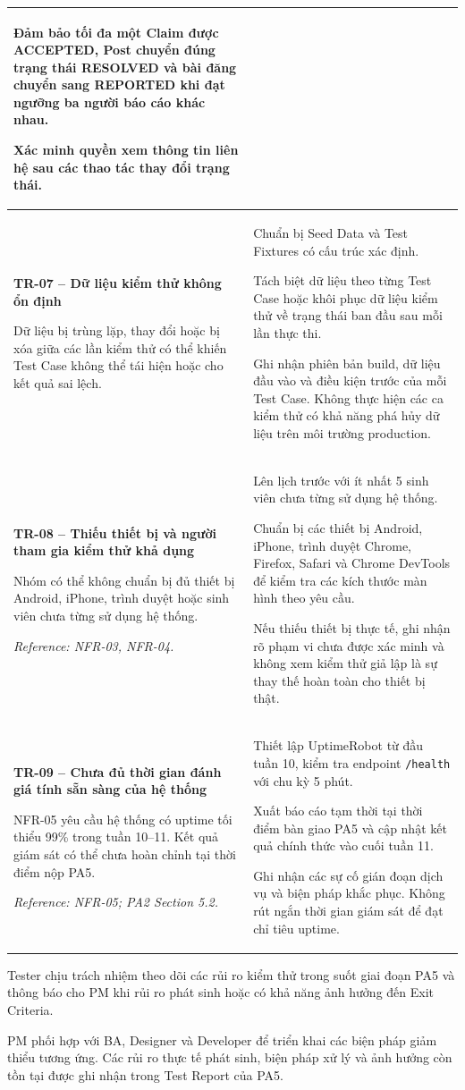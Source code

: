 \begin{longtable}{|p{}|p{}|}
Đảm bảo tối đa một Claim được ACCEPTED, 
Post chuyển đúng trạng thái RESOLVED và 
bài đăng chuyển sang REPORTED khi đạt ngưỡng 
ba người báo cáo khác nhau.

Xác minh quyền xem thông tin liên hệ sau 
các thao tác thay đổi trạng thái.
\\ \hline

\textbf{TR-07 -- Dữ liệu kiểm thử không ổn định}

Dữ liệu bị trùng lặp, thay đổi hoặc bị xóa 
giữa các lần kiểm thử có thể khiến Test Case 
không thể tái hiện hoặc cho kết quả sai lệch.
&
Chuẩn bị Seed Data và Test Fixtures có cấu trúc 
xác định.

Tách biệt dữ liệu theo từng Test Case hoặc 
khôi phục dữ liệu kiểm thử về trạng thái ban đầu 
sau mỗi lần thực thi.

Ghi nhận phiên bản build, dữ liệu đầu vào 
và điều kiện trước của mỗi Test Case. 
Không thực hiện các ca kiểm thử có khả năng 
phá hủy dữ liệu trên môi trường production.
\\ \hline

\textbf{TR-08 -- Thiếu thiết bị và người tham gia 
kiểm thử khả dụng}

Nhóm có thể không chuẩn bị đủ thiết bị 
Android, iPhone, trình duyệt hoặc sinh viên 
chưa từng sử dụng hệ thống.

\textit{Reference: NFR-03, NFR-04.}
&
Lên lịch trước với ít nhất 5 sinh viên chưa 
từng sử dụng hệ thống.

Chuẩn bị các thiết bị Android, iPhone, 
trình duyệt Chrome, Firefox, Safari và 
Chrome DevTools để kiểm tra các kích thước 
màn hình theo yêu cầu.

Nếu thiếu thiết bị thực tế, ghi nhận rõ 
phạm vi chưa được xác minh và không xem 
kiểm thử giả lập là sự thay thế hoàn toàn 
cho thiết bị thật.
\\ \hline

\textbf{TR-09 -- Chưa đủ thời gian đánh giá 
tính sẵn sàng của hệ thống}

NFR-05 yêu cầu hệ thống có uptime tối thiểu 
99\% trong tuần 10--11. Kết quả giám sát 
có thể chưa hoàn chỉnh tại thời điểm 
nộp PA5.

\textit{Reference: NFR-05; PA2 Section 5.2.}
&
Thiết lập UptimeRobot từ đầu tuần 10, 
kiểm tra endpoint \texttt{/health} 
với chu kỳ 5 phút.

Xuất báo cáo tạm thời tại thời điểm 
bàn giao PA5 và cập nhật kết quả chính thức 
vào cuối tuần 11.

Ghi nhận các sự cố gián đoạn dịch vụ 
và biện pháp khắc phục. Không rút ngắn 
thời gian giám sát để đạt chỉ tiêu uptime.
\\ \hline

\end{longtable}

Tester chịu trách nhiệm theo dõi các rủi ro kiểm thử 
trong suốt giai đoạn PA5 và thông báo cho PM khi 
rủi ro phát sinh hoặc có khả năng ảnh hưởng đến 
Exit Criteria.

PM phối hợp với BA, Designer và Developer để 
triển khai các biện pháp giảm thiểu tương ứng. 
Các rủi ro thực tế phát sinh, biện pháp xử lý 
và ảnh hưởng còn tồn tại được ghi nhận trong 
Test Report của PA5.